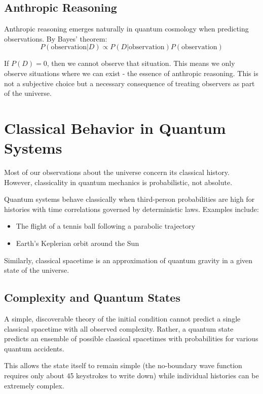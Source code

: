 \documentclass[12pt,a4paper]{article}
\begin{document}
\subsection{Anthropic Reasoning}

Anthropic reasoning emerges naturally in quantum cosmology when predicting observations. By Bayes' theorem:
\begin{equation}
P(\text{observation}|D) \propto P(D|\text{observation})P(\text{observation})
\end{equation}

If $P(D) = 0$, then we cannot observe that situation. This means we only observe situations where we can exist - the essence of anthropic reasoning. This is not a subjective choice but a necessary consequence of treating observers as part of the universe.

\section{Classical Behavior in Quantum Systems}

Most of our observations about the universe concern its classical history. However, classicality in quantum mechanics is probabilistic, not absolute.

Quantum systems behave classically when third-person probabilities are high for histories with time correlations governed by deterministic laws. Examples include:
\begin{itemize}
    \item The flight of a tennis ball following a parabolic trajectory
    \item Earth's Keplerian orbit around the Sun
\end{itemize}

Similarly, classical spacetime is an approximation of quantum gravity in a given state of the universe.

\subsection{Complexity and Quantum States}

A simple, discoverable theory of the initial condition cannot predict a single classical spacetime with all observed complexity. Rather, a quantum state predicts an ensemble of possible classical spacetimes with probabilities for various quantum accidents.

This allows the state itself to remain simple (the no-boundary wave function requires only about 45 keystrokes to write down) while individual histories can be extremely complex.
\end{document}
